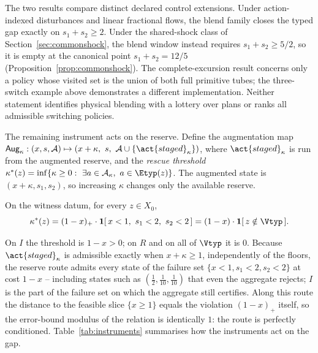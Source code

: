The two results compare distinct declared control extensions. Under action-indexed disturbances and linear fractional flows, the blend family closes the typed gap exactly on $s_1+s_2\ge2$. Under the shared-shock class of Section~\ref{sec:commonshock}, the blend window instead requires $s_1+s_2\ge5/2$, so it is empty at the canonical point $s_1+s_2=12/5$ (Proposition~\ref{prop:commonshock}). The complete-excursion result concerns only a policy whose visited set is the union of both full primitive tubes; the three-switch example above demonstrates a different implementation. Neither statement identifies physical blending with a lottery over plans or ranks all admissible switching policies.

The remaining instrument acts on the reserve. Define the augmentation map $\mathsf{Aug}_\kappa:(x,s,\mathcal A)\mapsto(x+\kappa,\ s,\ \mathcal A\cup\{\act{staged}_\kappa\})$, where $\act{staged}_\kappa$ is  run from the augmented reserve, and the \emph{rescue threshold} $\kappa^*(z)=\inf\{\kappa\ge0:\ \exists a\in\mathcal A_\kappa,\ a\in\Etyp(z)\}$. The augmented state is $(x+\kappa,s_1,s_2)$, so increasing $\kappa$ changes only the available reserve.

\begin{proposition}\label{prop:rescue}
On the witness datum, for every $z\in X_0$,
\[
\kappa^*(z)=(1-x)_+\cdot\mathbf 1[\,x<1,\ s_1<2,\ s_2<2\,]=(1-x)\cdot\mathbf 1[\,z\notin\Vtyp\,].
\]
\end{proposition}

On $I$ the threshold is $1-x>0$; on $R$ and on all of $\Vtyp$ it is $0$. Because $\act{staged}_\kappa$ is admissible exactly when $x+\kappa\ge1$, independently of the floors, the reserve route admits every state of the failure set $\{x<1,s_1<2,s_2<2\}$ at cost $1-x$ -- including states such as $(\tfrac12,\tfrac1{10},\tfrac1{10})$ that even the aggregate rejects; $I$ is the part of the failure set on which the aggregate still certifies. Along this route the distance to the feasible slice $\{x\ge1\}$ equals the violation $(1-x)_+$ itself, so the error-bound modulus \citep{Fabian2010} of the relation is identically $1$: the route is perfectly conditioned. Table~\ref{tab:instruments} summarises how the instruments act on the gap.

